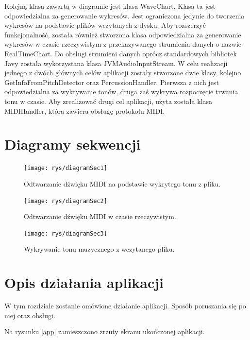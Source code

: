 Kolejną klasą zawartą w diagramie jest klasa WaveChart. Klasa ta jest odpowiedzialna za generowanie wykresów. Jest ograniczona jedynie do tworzenia wykresów na podstawie plików wczytanych z dysku. Aby rozszerzyć funkcjonalność, została również stworzona klasa odpowiedzialna za generowanie wykresów w czasie rzeczywistym z przekazywanego strumienia danych o nazwie RealTimeChart. Do obsługi strumieni danych oprócz standardowych bibliotek Javy została wykorzystana klasa JVMAudioInputStream. W celu realizacji jednego z dwóch głównych celów aplikacji zostały stworzone dwie klasy, kolejno GetInfoFromPitchDetector oraz PercussionHandler. Pierwsza z nich jest odpowiedzialna za wykrywanie tonów, druga zaś wykrywa rozpoczęcie trwania tonu w czasie. Aby zrealizować drugi cel aplikacji, użyta została klasa MIDIHandler, która zawiera obsługę protokołu MIDI.







\section{{Diagramy sekwencji}}


\begin{figure}[h!]
  \centering
  \texttt{[image: rys/diagramSec1]}
  \caption{Odtwarzanie dźwięku MIDI na podstawie wykrytego tonu z pliku.}
  \label{diagram1}
\end{figure}


\begin{figure}[h!]
  \centering
  \texttt{[image: rys/diagramSec2]}
  \caption{Odtwarzanie dźwięku MIDI w czasie rzeczywistym.}
  \label{diagram2}
\end{figure}

\begin{figure}[h!]
  \centering
  \texttt{[image: rys/diagramSec3]}
  \caption{Wykrywanie tonu muzycznego z wczytanego pliku.}
  \label{diagram3}
\end{figure}
\newpage

\section{{Opis działania aplikacji}}

W tym rozdziale zostanie omówione działanie aplikacji. Sposób poruszania się po niej oraz obsługi.


Na rysunku \ref{app} zamieszczono zrzuty ekranu ukończonej aplikacji.

